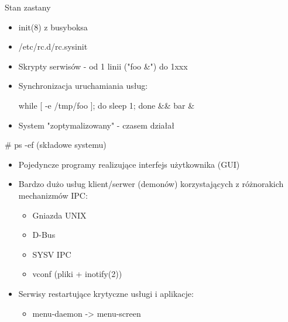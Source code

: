 \documentclass[presentation,aspectratio=43,12pt]{beamer}
\begin{document}
\begin{frame}[label=sec-4-1]{Stan zastany}
\begin{itemize}
\item init(8) z busyboksa
\item /etc/rc.d/rc.sysinit
\item Skrypty serwisów - od 1 linii  ("foo \&") do 1xxx

\item Synchronizacja uruchamiania usług:

while [ -e /tmp/foo ]; do sleep 1; done \&\& bar \&

\item <2-> System "zoptymalizowany" - czasem działał
\end{itemize}

\end{frame}
\begin{frame}[label=sec-4-2]{\# ps -ef (składowe systemu)}
\begin{itemize}
\item Pojedyncze programy realizujące interfejs użytkownika (GUI)

\item <2-> Bardzo dużo usług klient/serwer (demonów) korzystających z
różnorakich mechanizmów IPC:
\begin{itemize}
\item Gniazda UNIX
\item D-Bus
\item SYSV IPC
\item vconf (pliki + inotify(2))
\end{itemize}

\item <3-> Serwisy restartujące krytyczne usługi i aplikacje:
\begin{itemize}
\item menu-daemon -> menu-screen
\end{itemize}
\end{itemize}
\end{frame}
\end{document}
